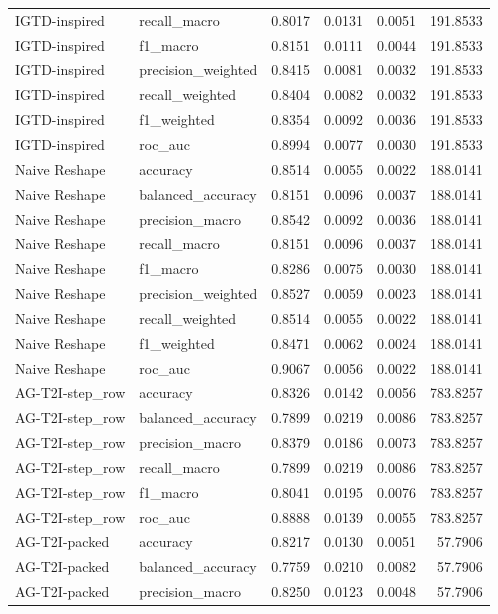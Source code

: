\begin{tabular}{llrrrr}
IGTD-inspired & recall_macro & 0.8017 & 0.0131 & 0.0051 & 191.8533 \\
IGTD-inspired & f1_macro & 0.8151 & 0.0111 & 0.0044 & 191.8533 \\
IGTD-inspired & precision_weighted & 0.8415 & 0.0081 & 0.0032 & 191.8533 \\
IGTD-inspired & recall_weighted & 0.8404 & 0.0082 & 0.0032 & 191.8533 \\
IGTD-inspired & f1_weighted & 0.8354 & 0.0092 & 0.0036 & 191.8533 \\
IGTD-inspired & roc_auc & 0.8994 & 0.0077 & 0.0030 & 191.8533 \\
Naive Reshape & accuracy & 0.8514 & 0.0055 & 0.0022 & 188.0141 \\
Naive Reshape & balanced_accuracy & 0.8151 & 0.0096 & 0.0037 & 188.0141 \\
Naive Reshape & precision_macro & 0.8542 & 0.0092 & 0.0036 & 188.0141 \\
Naive Reshape & recall_macro & 0.8151 & 0.0096 & 0.0037 & 188.0141 \\
Naive Reshape & f1_macro & 0.8286 & 0.0075 & 0.0030 & 188.0141 \\
Naive Reshape & precision_weighted & 0.8527 & 0.0059 & 0.0023 & 188.0141 \\
Naive Reshape & recall_weighted & 0.8514 & 0.0055 & 0.0022 & 188.0141 \\
Naive Reshape & f1_weighted & 0.8471 & 0.0062 & 0.0024 & 188.0141 \\
Naive Reshape & roc_auc & 0.9067 & 0.0056 & 0.0022 & 188.0141 \\
AG-T2I-step_row & accuracy & 0.8326 & 0.0142 & 0.0056 & 783.8257 \\
AG-T2I-step_row & balanced_accuracy & 0.7899 & 0.0219 & 0.0086 & 783.8257 \\
AG-T2I-step_row & precision_macro & 0.8379 & 0.0186 & 0.0073 & 783.8257 \\
AG-T2I-step_row & recall_macro & 0.7899 & 0.0219 & 0.0086 & 783.8257 \\
AG-T2I-step_row & f1_macro & 0.8041 & 0.0195 & 0.0076 & 783.8257 \\
AG-T2I-step_row & roc_auc & 0.8888 & 0.0139 & 0.0055 & 783.8257 \\
AG-T2I-packed & accuracy & 0.8217 & 0.0130 & 0.0051 & 57.7906 \\
AG-T2I-packed & balanced_accuracy & 0.7759 & 0.0210 & 0.0082 & 57.7906 \\
AG-T2I-packed & precision_macro & 0.8250 & 0.0123 & 0.0048 & 57.7906 \\

\end{tabular}
